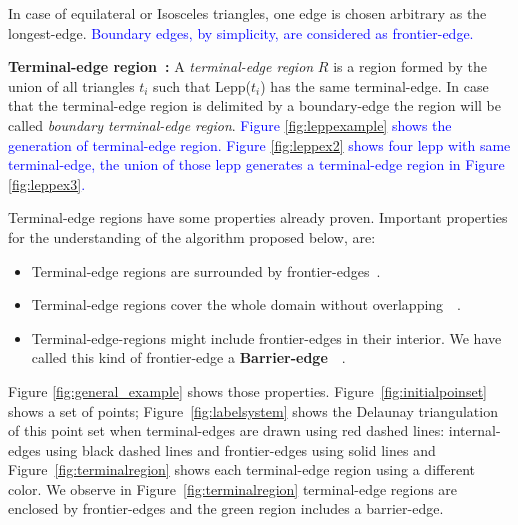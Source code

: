 In case of equilateral or Isosceles triangles, one edge is chosen arbitrary as the longest-edge. \textcolor{blue}{ Boundary edges, by simplicity, are considered as frontier-edge.}


\begin{definition}{\textbf{Terminal-edge region~\cite{Ascom209}:}}
\label{d:terminaledgeregion}
A {\em terminal-edge region} $R$ is a region formed by the union of all triangles $t_i$ such that Lepp($t_i$) has the same terminal-edge.  In case that the terminal-edge region  is delimited by a boundary-edge the region will be called {\em boundary terminal-edge region}. \textcolor{blue}{ Figure \ref{fig:leppexample} shows the generation of terminal-edge region. Figure \ref{fig:leppex2} shows four lepp with same terminal-edge, the union of those lepp generates a terminal-edge region in Figure \ref{fig:leppex3}.}
\end{definition}


\noindent
Terminal-edge regions have some properties already proven. Important properties for the understanding of the algorithm proposed below, are: 

\begin{itemize}
    \item Terminal-edge regions are surrounded by frontier-edges~\cite{Ascom209}.
    \item Terminal-edge regions cover the whole domain without overlapping~\cite{Ascom209}~\cite{Ojeda2018ANA}.
    \item Terminal-edge-regions might include frontier-edges in their interior. We have called this kind of frontier-edge a \textbf{Barrier-edge}~\cite{Ascom209}~\cite{Ojeda2018ANA}.
  
\end{itemize}
\noindent



\noindent
Figure \ref{fig:general_example} shows those properties. Figure~\ref{fig:initialpoinset} shows a set of points; Figure~\ref{fig:labelsystem} shows the Delaunay triangulation of this point set when terminal-edges are drawn using red dashed lines: internal-edges using black dashed lines and frontier-edges using  solid lines and Figure~\ref{fig:terminalregion} shows each terminal-edge region using a different color. We observe in Figure~\ref{fig:terminalregion} terminal-edge regions are enclosed by frontier-edges and the green region includes a barrier-edge.



